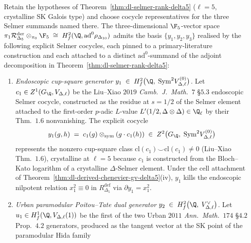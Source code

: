 \begin{theorem}
\label{thm:dl-selmer-generators-explicit}
\ClaimStatusConditional
Retain the hypotheses of Theorem~\ref{thm:dl-selmer-rank-delta5}
($\ell = 5$, crystalline SK Galois type) and choose cocycle
representatives for the three Selmer summands named there. The
three-dimensional
$\F_5$-vector space
$\pi_1\mathcal R^{\mathrm{der}}_{\Delta_5}\otimes_{\pi_0}\F_5
\;\cong\; H^2_f(\Q,\mathrm{ad}^0\rho_{\Delta_{10}})$
admits the basis $\{y_1,y_2,y_3\}$ realised by the following explicit
Selmer cocycles, each pinned to a primary-literature construction and
each attached to a distinct $\mathrm{ad}^0$-summand of
the adjoint decomposition in Theorem~\ref{thm:dl-selmer-rank-delta5}:
\begin{enumerate}
\item[(i)] \emph{Endoscopic cup-square generator}
 $y_1 \;\in\; H^2_f\bigl(\Q,\;\mathrm{Sym}^2 V_{\Delta,\ell}^{(0)}\bigr)$.
 Let $c_1\in Z^1(G_\Q,V_{\Delta,\ell})$ be the Liu--Xiao $2019$
 \emph{Camb.\ J.\ Math.}~$7$ \S $5.3$ endoscopic Selmer cocycle,
 constructed as the residue at $s = 1/2$ of the Selmer element
 attached to the first-order $p$-adic $L$-value
 $L'(1/2, \Delta\otimes\Delta)\in\Q_\ell$ by their Thm.~$1.6$
 nonvanishing. The explicit cocycle
 \begin{equation}
 \label{eq:y1-cocycle}
 y_1(g,h) \;=\; c_1(g)\otimes_{\mathrm{sym}} (g\cdot c_1(h))\;\in\;
 Z^2\bigl(G_\Q,\;\mathrm{Sym}^2 V_{\Delta,\ell}^{(0)}\bigr)
 \end{equation}
 represents the nonzero cup-square class
 $\mathrm{cl}(c_1)\smile\mathrm{cl}(c_1)\ne 0$
 (Liu--Xiao Thm.~$1.6$), crystalline at $\ell = 5$ because $c_1$ is
 constructed from the Bloch--Kato logarithm of a crystalline
 $\Delta$-Selmer element. Under the cell attachment of
 Theorem~\ref{thm:dl-derived-chenevier-gv-delta5}(iv), $y_1$ kills the
 endoscopic nilpotent relation $x_1^2 \equiv 0$ in
 $R^{\mathrm{def}}_{\Delta_5}$ via $\partial y_1 = x_1^2$.
\item[(ii)] \emph{Urban paramodular Poitou--Tate dual generator}
 $y_2 \;\in\; H^2_f\bigl(\Q,\;V_{\Delta,\ell}^\vee\bigr)$.
 Let $u_1\in H^1_f(\Q, V_{\Delta,\ell}(1))$ be the first of the two
 Urban $2011$ \emph{Ann.\ Math.}~$174$ \S $4.2$ Prop.~$4.2$
 generators, produced as the tangent vector at the SK point of the
 paramodular Hida family

\end{enumerate}
\end{theorem}
